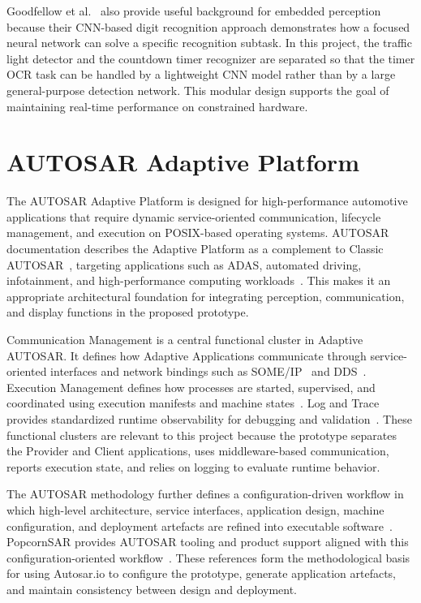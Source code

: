 Goodfellow et al.~\cite{goodfellow2014multidigitnumberrecognitionstreet} also provide useful background for embedded perception because their CNN-based digit recognition approach demonstrates how a focused neural network can solve a specific recognition subtask. In this project, the traffic light detector and the countdown timer recognizer are separated so that the timer OCR task can be handled by a lightweight CNN model rather than by a large general-purpose detection network. This modular design supports the goal of maintaining real-time performance on constrained hardware.

\section{AUTOSAR Adaptive Platform}

The AUTOSAR Adaptive Platform is designed for high-performance automotive applications that require dynamic service-oriented communication, lifecycle management, and execution on POSIX-based operating systems. AUTOSAR documentation describes the Adaptive Platform as a complement to Classic AUTOSAR~\cite{autosar_layered_arch}, targeting applications such as ADAS, automated driving, infotainment, and high-performance computing workloads~\cite{autosar_platform_design,autosar_sw_arch}. This makes it an appropriate architectural foundation for integrating perception, communication, and display functions in the proposed prototype.

Communication Management is a central functional cluster in Adaptive AUTOSAR. It defines how Adaptive Applications communicate through service-oriented interfaces and network bindings such as SOME/IP~\cite{autosar_someip} and DDS~\cite{autosar_com_mgmt, autosar_dds}. Execution Management defines how processes are started, supervised, and coordinated using execution manifests and machine states~\cite{autosar_exec_mgmt}. Log and Trace provides standardized runtime observability for debugging and validation~\cite{autosar_log_trace}. These functional clusters are relevant to this project because the prototype separates the Provider and Client applications, uses middleware-based communication, reports execution state, and relies on logging to evaluate runtime behavior.

The AUTOSAR methodology further defines a configuration-driven workflow in which high-level architecture, service interfaces, application design, machine configuration, and deployment artefacts are refined into executable software~\cite{AUTOSAR_TR_AdaptiveMethodology_R22-11}. PopcornSAR provides AUTOSAR tooling and product support aligned with this configuration-oriented workflow~\cite{popcornsar_intro}. These references form the methodological basis for using Autosar.io to configure the prototype, generate application artefacts, and maintain consistency between design and deployment.

